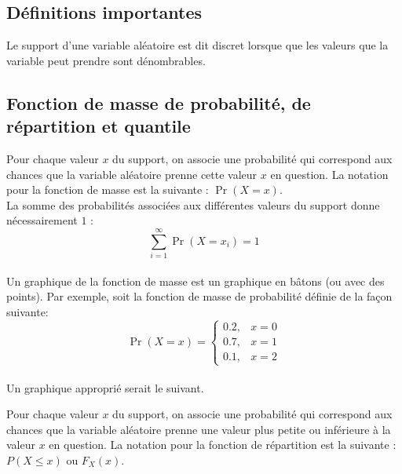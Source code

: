 \documentclass[10pt, french]{article}
\begin{document}
\begin{multicols*}{2}
\subsection{Définitions importantes}
\begin{definitionNOHFILL}
Le support d'une variable aléatoire est dit discret lorsque que les valeurs que la variable peut prendre sont dénombrables.
\end{definitionNOHFILL}

\subsection{Fonction de masse de probabilité, de répartition et quantile}
\begin{definitionNOHFILLsub}
Pour chaque valeur $x$ du support, on associe une probabilité qui correspond aux chances que la variable aléatoire prenne cette valeur $x$ en question. La notation pour la fonction de masse est la suivante : $\Pr(X = x).$\\

La somme des probabilités associées aux différentes valeurs du support donne nécessairement $1$ : 
$$\sum_{i=1}^\infty \Pr(X = x_i) = 1$$\\

Un graphique de la fonction de masse est un graphique en bâtons (ou avec des points). Par exemple, soit la fonction de masse de probabilité définie de la façon suivante:
$$\Pr(X = x) = 
\left\{
	\begin{array}{ll}
		0.2,  &  x = 0\\
		0.7, & x = 1\\
		0.1, & x = 2
	\end{array}
\right.
$$\\

Un graphique approprié serait le suivant.\\

\begin{center}
\end{center}
\end{definitionNOHFILLsub}

\begin{definitionNOHFILLsub}
Pour chaque valeur $x$ du support, on associe une probabilité qui correspond aux chances que la variable aléatoire prenne une valeur plus petite ou inférieure à la valeur $x$ en question. La notation pour la fonction de répartition est la suivante : $P(X \leq x)$ ou $F_X(x).$ \\


\end{definitionNOHFILLsub}
\end{multicols*}
\end{document}
